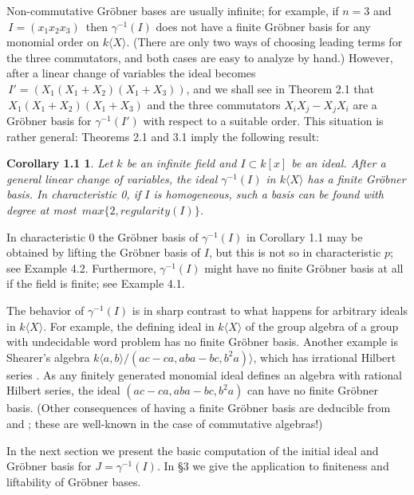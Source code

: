 \documentclass{proc-l}
\theoremstyle{plain}
\newtheorem*{theorem1}{Corollary 1.1}
\theoremstyle{definition}
\begin{document}
 Non-commutative  Gr\"{o}bner bases are usually infinite; for
example, if $n=3$ and  $\,I = (x_{1}x_{2}x_{3}) \,$ then $\gamma ^{-1}(I)$
does not have a finite Gr\"{o}bner basis
for any monomial order on $k \langle X \rangle $.  (There are only two ways
of choosing leading terms for the three commutators,
and both cases are easy to analyze by hand.)
However, after a linear change of variables 
the ideal becomes $\,I'=(X_{1}(X_{1}+X_{2})(X_{1}+X_{3}))$, and we shall 
see in Theorem 2.1 that
$\,X_{1}(X_{1}+X_{2})(X_{1}+X_{3})$ and the three commutators 
$X_{i} X_{j} - X_{j} X_{i}$ are a Gr\"{o}bner basis for $\gamma ^{-1}(I')$
with respect to a suitable order. This situation is rather general: 
Theorems 2.1 and 3.1  imply the following  result:

\begin{theorem1} Let $k$ be an infinite field and
$I\subset k[x]$ be an ideal.
After a general linear change of variables,
the ideal  $\gamma ^{-1}(I)$ in $k\langle X \rangle $
has a finite Gr\"{o}bner basis.  
In characteristic 0, if $I$ is homogeneous,
such a basis
can be found with degree at most 
$\,max \{2,regularity (I) \}$.
\end{theorem1}


In characteristic 0 the Gr\"{o}bner basis of $\gamma ^{-1}(I)$ in Corollary 1.1
may be obtained by lifting the Gr\"{o}bner basis
of $I$, but this is not so in characteristic $p$; see Example 4.2.
Furthermore, $\gamma ^{-1}(I)$ might have no finite Gr\"{o}bner basis at all
if the field is finite; see Example 4.1. 

The behavior of $\gamma ^{-1}(I)$
is in sharp contrast to what happens for arbitrary ideals in 
$k \langle X \rangle $.
For example, the defining ideal
in $k \langle X \rangle $ of the group algebra
of a group with undecidable word problem has no 
finite Gr\"{o}bner basis. Another example is Shearer's algebra
$k\langle a,b\rangle /(ac-ca,aba-bc,b^{2}a)\rangle$,
which has irrational Hilbert series \cite{Sh}. As any finitely
generated monomial ideal defines an algebra with rational Hilbert
series, the ideal $(ac-ca,aba-bc,b^{2}a)$ can have no finite 
Gr\"{o}bner basis. (Other consequences of having a finite
Gr\"{o}bner basis are deducible from \cite{An} and \cite{Ba};
these are well-known in the case of commutative algebras!)

In the next section we present the basic computation of the
initial ideal and Gr\"{o}bner basis for $J = \gamma ^{-1}(I)$.
In \S 3 we give the application to finiteness and liftability
of Gr\"{o}bner bases.
\end{document}
